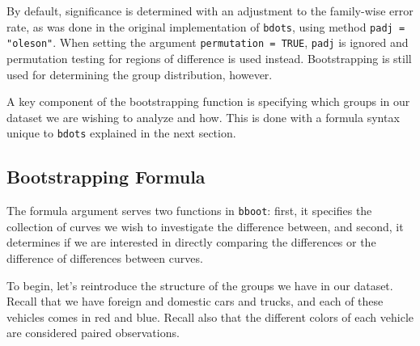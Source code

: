 \documentclass{article}
\newcommand{\xt}{\texttt}%
\begin{document}
By default, significance is determined with an adjustment to the family-wise error rate, as was done in the original implementation of \xt{bdots}, using method \xt{padj = "oleson"}. When setting the argument \xt{permutation = TRUE}, \xt{padj} is ignored and permutation testing for regions of difference is used instead. Bootstrapping is still used for determining the group distribution, however.

A key component of the bootstrapping function is specifying which groups in our dataset we are wishing to analyze and how. This is done with a formula syntax unique to \xt{bdots} explained in the next section.

\subsection{Bootstrapping Formula}


The formula argument serves two functions in \xt{bboot}: first, it specifies the collection of curves we wish to investigate the difference between, and second, it determines if we are interested in directly comparing the differences or the difference of differences between curves. 

To begin, let's reintroduce the structure of the groups we have in our dataset. Recall that we have foreign and domestic cars and trucks, and each of these vehicles comes in red and blue. Recall also that the different colors of each vehicle are considered paired observations.

\end{document}
